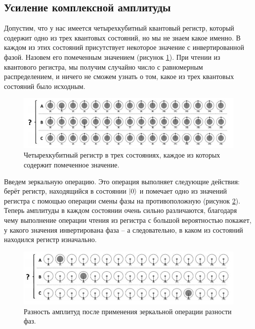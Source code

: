 \subsection{Усиление комплексной амплитуды}\label{yka}

Допустим, что у нас имеется четырехкубитный квантовый регистр, который содержит одно из трех квантовых состояний, но мы не знаем какое именно. В каждом из этих состояний присутствует некоторое значение с инвертированной фазой. Назовем его помеченным значением (рисунок \ref{img:ampl-01}). При чтении из квантового регистра, мы получим случайно число с равномерным распределением, и ничего не сможем узнать о том, какое из трех квантовых состояний было исходным.

\begin{figure}[H]
	\begin{center}
		\includegraphics[scale=0.58]{img/amplitude-example-01.png}
	\end{center}
	\captionsetup{justification=centering}
	\caption{Четырехкубитный регистр в трех состояниях, каждое из которых содержит помеченное значение.}
	\label{img:ampl-01}
\end{figure}

Введем зеркальную операцию. Это операция выполняет следующие действия: берёт регистр, находящийся в состоянии $\lvert0\rangle$ и помечает одно из значений регистра с помощью операции смены фазы на противоположную (рисунок \ref{img:ampl-02}). Теперь амплитуды в каждом состоянии очень сильно различаются, благодаря чему выполнение операции чтения из регистра с большой вероятностью покажет, у какого значения инвертирована фаза -- а следовательно, в каком из состояний находился регистр изначально.

\begin{figure}[H]
	\begin{center}
		\includegraphics[scale=0.58]{img/amplitude-example-02.png}
	\end{center}
	\captionsetup{justification=centering}
	\caption{Разность амплитуд после применения зеркальной операции разности фаз.}
	\label{img:ampl-02}
\end{figure}

